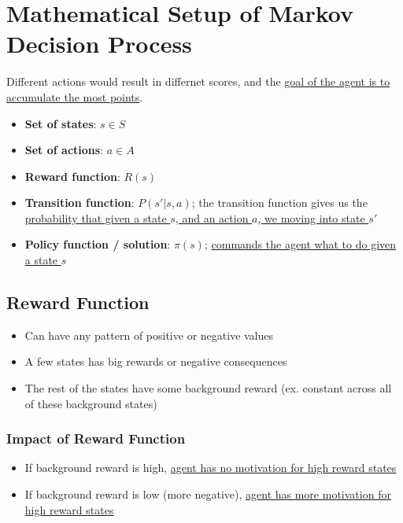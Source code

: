 \section{Mathematical Setup of Markov Decision Process}

  Different actions would result in differnet scores, and the
  \ul{goal of the agent is to accumulate the most points}.

  \begin{itemize}
    \item \textbf{Set of states}: $ s \in S $
    \item \textbf{Set of actions}: $ a \in A $
    \item \textbf{Reward function}: $ R\left( s \right) $
    \item \textbf{Transition function}: $ P\left( s' | s, a \right) $;
    the transition function gives us the \ul{probability that
    given a state $ s $, and an action $ a $, we moving into state $ s' $}
    \item \textbf{Policy function / solution}: $ \pi\left( s \right) $;
    \ul{commands the agent what to do given a state $ s $}
  \end{itemize}

  \subsection{Reward Function}

    \begin{itemize}
      \item Can have any pattern of positive or negative values
      \item A few states has big rewards or negative consequences
      \item The rest of the states have some background reward (ex.
      constant across all of these background states)
    \end{itemize}

    \subsubsection{Impact of Reward Function}

      \begin{itemize}
        \item If background reward is high, \ul{agent has no motivation
        for high reward states}
        \item If background reward is low (more negative), \ul{agent
        has more motivation for high reward states}
      \end{itemize}

